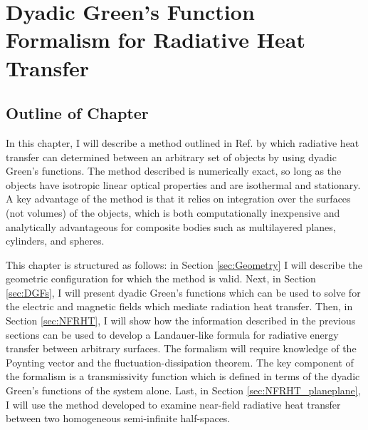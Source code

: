 \chapter[Dyadic Green's Function Formalism for Radiative Heat Transfer][Dyadic Green's Function Formalism for Radiative Heat Transfer]{Dyadic Green's Function Formalism for Radiative Heat Transfer} \label{ch:DGFs}
%
\section{Outline of Chapter}
%
In this chapter, I will describe a method outlined in Ref.  by which radiative heat transfer can determined between an arbitrary set of objects by using dyadic Green's functions. The method described is numerically exact, so long as the objects have isotropic linear optical properties and are isothermal and stationary. A key advantage of the method is that it relies on integration over the surfaces (not volumes) of the objects, which is both computationally inexpensive and analytically advantageous for composite bodies such as multilayered planes, cylinders, and spheres.

This chapter is structured as follows: in Section \ref{sec:Geometry} I will describe the geometric configuration for which the method is valid. Next, in Section \ref{sec:DGFs}, I will present dyadic Green's functions which can be used to solve for the electric and magnetic fields which mediate radiation heat transfer. Then, in Section \ref{sec:NFRHT}, I will show how the information described in the previous sections can be used to develop a Landauer-like formula for radiative energy transfer between arbitrary surfaces. The formalism will require knowledge of the Poynting vector and the fluctuation-dissipation theorem. The key component of the formalism is a transmissivity function which is defined in terms of the dyadic Green's functions of the system alone. Last, in Section \ref{sec:NFRHT_planeplane}, I will use the method developed to examine near-field radiative heat transfer between two homogeneous semi-infinite half-spaces.


